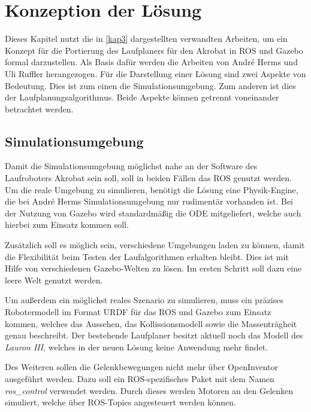 \chapter{Konzeption der Lösung}
\label{kap4}

Dieses Kapitel nutzt die in \autoref{kap3} dargestellten verwandten Arbeiten, um ein Konzept für die Portierung des Laufplaners für den Akrobat in \ac{ROS} und Gazebo formal darzustellen. Als Basis dafür werden die Arbeiten von André Herms \autocite{herms2004} und Uli Ruffler \autocite{ruffler2006} herangezogen. Für die Darstellung einer Lösung sind zwei Aspekte von Bedeutung. Dies ist zum einen die Simulationsumgebung. Zum anderen ist dies der Laufplanungsalgorithmus. Beide Aspekte können getrennt voneinander betrachtet werden.

\section{Simulationsumgebung} 

Damit die Simulationsumgebung möglichst nahe an der Software des Laufroboters Akrobat sein soll, soll in beiden Fällen das \ac{ROS} genutzt werden. Um die reale Umgebung zu simulieren, benötigt die Lösung eine Physik-Engine, die bei André Herms \autocite{herms2004} Simulationsumgebung nur rudimentär vorhanden ist. Bei der Nutzung von Gazebo wird standardmäßig die \acf{ODE} mitgeliefert, welche auch hierbei zum Einsatz kommen soll.

Zusätzlich soll es möglich sein, verschiedene Umgebungen laden zu können, damit die Flexibilität beim Testen der Laufalgorithmen erhalten bleibt. Dies ist mit Hilfe von verschiedenen Gazebo-Welten zu lösen. Im ersten Schritt soll dazu eine leere Welt genutzt werden.

Um außerdem ein möglichst reales Szenario zu simulieren, muss ein präzises Robotermodell im Format \ac{URDF} für das \ac{ROS} und Gazebo zum Einsatz kommen, welches das Aussehen, das Kollissionsmodell sowie die Massenträgheit genau beschreibt. Der bestehende Laufplaner besitzt aktuell noch das Modell des \emph{Lauron III}, welches in der neuen Lösung keine Anwendung mehr findet.

Des Weiteren sollen die Gelenkbewegungen nicht mehr über OpenInventor \autocite{inventor} ausgeführt werden. Dazu soll ein \ac{ROS}-spezifisches Paket mit dem Namen \emph{ros\_control} verwendet werden. Durch dieses werden Motoren an den Gelenken simuliert, welche über \ac{ROS}-Topics angesteuert werden können.

